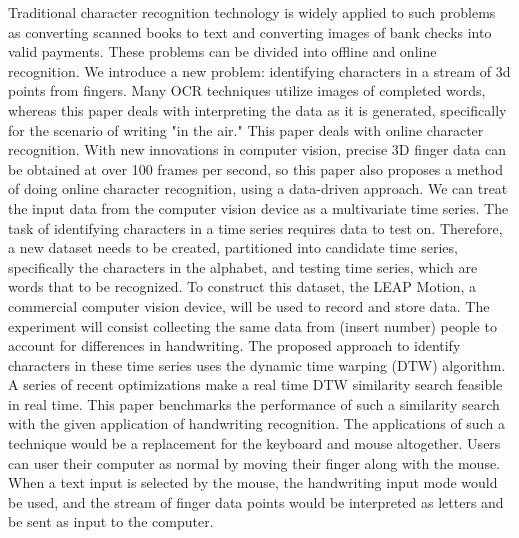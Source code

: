 Traditional character recognition technology is widely applied to such problems as converting scanned books to text and converting images of bank checks into valid payments. These problems can be divided into offline and online recognition.
We introduce a new problem: identifying characters in a stream of 3d points from fingers. Many OCR techniques utilize images of completed words, whereas this paper deals with interpreting the data as it is generated, specifically for the scenario of writing "in the air."  
This paper deals with online character recognition. With new innovations in computer vision, precise 3D finger data can be obtained at over 100 frames per second, so this paper also proposes a method of doing online character recognition, using a data-driven approach. We can treat the input data from the computer vision device as a multivariate time series.
The task of identifying characters in a time series requires data to test on. Therefore, a new dataset needs to be created, partitioned into candidate time series, specifically the characters in the alphabet, and testing time series, which are words that to be recognized. To construct this dataset, the LEAP Motion, a commercial computer vision device, will be used to record and store data. The experiment will consist collecting the same data from  (insert number) people to account for differences in handwriting.
The proposed approach to identify characters in these time series uses the dynamic time warping (DTW) algorithm. A series of recent optimizations make a real time DTW similarity search feasible in real time. This paper benchmarks the performance of such a similarity search with the given application of handwriting recognition.
The applications of such a technique would be a replacement for the keyboard and mouse altogether. Users can user their computer as normal by moving their finger along with the mouse. When a text input is selected by the mouse, the handwriting input mode would be used, and the stream of finger data points would be interpreted as letters and be sent as input to the computer.
